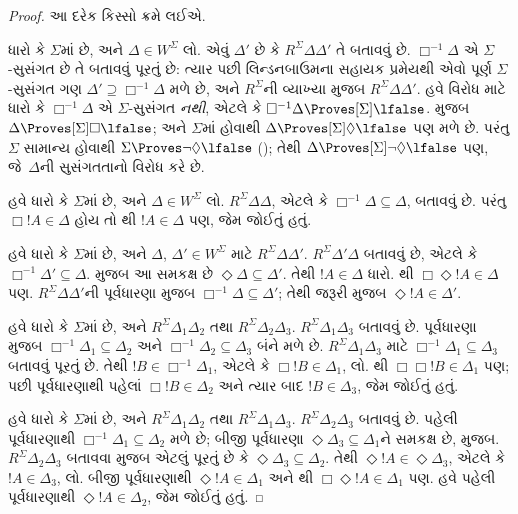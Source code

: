 \begin{proof}
  આ દરેક કિસ્સો ક્રમે લઈએ.

  ધારો કે $\Sigma$માં  છે, અને $\Delta \in W^\Sigma$ લો.
  એવું $\Delta'$ છે કે $R^\Sigma \Delta\Delta'$ તે બતાવવું છે.
  $\Box^{-1}\Delta$ એ $\Sigma$-સુસંગત છે તે બતાવવું પૂરતું છે:
  ત્યાર પછી લિન્ડનબાઉમના સહાયક પ્રમેયથી એવો પૂર્ણ
  $\Sigma$-સુસંગત ગણ $\Delta' \supseteq \Box^{-1}\Delta$ મળે છે,
  અને $R^\Sigma$ની વ્યાખ્યા
  મુજબ
  $R^\Sigma \Delta\Delta'$. હવે વિરોધ માટે ધારો કે
  $\Box^{-1}\Delta$ એ $\Sigma$-સુસંગત \emph{નથી}, એટલે કે
  $\Box^{-1}\Delta \Proves[\Sigma] \lfalse$.
   મુજબ $\Delta \Proves[\Sigma]
  \Box\lfalse$; અને $\Sigma$માં  હોવાથી
  $\Delta \Proves[\Sigma] \Diamond\lfalse$ પણ મળે છે.
  પરંતુ $\Sigma$ સામાન્ય હોવાથી $\Sigma \Proves
  \lnot\Diamond \lfalse$ ();
  તેથી $\Delta \Proves[\Sigma] \lnot\Diamond \lfalse$ પણ,
  જે~$\Delta$ની સુસંગતતાનો વિરોધ કરે છે.

  હવે ધારો કે $\Sigma$માં  છે, અને $\Delta \in W^\Sigma$
  લો. $R^\Sigma \Delta\Delta$, એટલે કે
  $\Box^{-1}\Delta \subseteq \Delta$, બતાવવું છે. પરંતુ
  $\Box!A \in \Delta$ હોય તો થી $!A \in \Delta$ પણ,
  જેમ જોઈતું હતું.

  હવે ધારો કે $\Sigma$માં  છે, અને $\Delta$,
  $\Delta' \in W^\Sigma$ માટે $R^\Sigma \Delta\Delta'$.
  $R^\Sigma \Delta'\Delta$ બતાવવું છે, એટલે કે
  $\Box^{-1}\Delta' \subseteq \Delta$.
     મુજબ આ સમકક્ષ છે
  $\Diamond\Delta \subseteq \Delta'$. તેથી $!A \in \Delta$
  ધારો. થી $\Box\Diamond!A \in \Delta$ પણ.
  $R^\Sigma \Delta\Delta'$ની પૂર્વધારણા
   મુજબ
  $\Box^{-1}\Delta \subseteq \Delta'$; તેથી જરૂરી મુજબ
  $\Diamond!A \in \Delta'$.

  હવે ધારો કે $\Sigma$માં  છે, અને $R^\Sigma
  \Delta_1\Delta_2$ તથા $R^\Sigma \Delta_2\Delta_3$.
  $R^\Sigma \Delta_1\Delta_3$ બતાવવું છે. પૂર્વધારણા
   મુજબ
  $\Box^{-1}\Delta_1 \subseteq \Delta_2$ અને
  $\Box^{-1}\Delta_2 \subseteq \Delta_3$ બંને મળે છે.
  $R^\Sigma \Delta_1\Delta_3$ માટે
  $\Box^{-1}\Delta_1 \subseteq \Delta_3$ બતાવવું પૂરતું છે.
  તેથી $!B \in \Box^{-1}\Delta_1$, એટલે કે
  $\Box!B \in \Delta_1$, લો. થી
  $\Box\Box!B \in \Delta_1$ પણ; પછી પૂર્વધારણાથી પહેલાં
  $\Box!B \in \Delta_2$ અને ત્યાર બાદ $!B \in \Delta_3$,
  જેમ જોઈતું હતું.

  હવે ધારો કે $\Sigma$માં  છે, અને $R^\Sigma
  \Delta_1\Delta_2$ તથા $R^\Sigma \Delta_1\Delta_3$.
  $R^\Sigma \Delta_2\Delta_3$ બતાવવું છે. પહેલી પૂર્વધારણાથી
  $\Box^{-1}\Delta_1 \subseteq \Delta_2$
   મળે છે;
  બીજી પૂર્વધારણા $\Diamond\Delta_3 \subseteq \Delta_1$ને
  સમકક્ષ છે,
     મુજબ.
  $R^\Sigma \Delta_2\Delta_3$ બતાવવા
   મુજબ
    એટલું પૂરતું છે કે%
  $\Diamond\Delta_3 \subseteq \Delta_2$.
  તેથી $\Diamond!A \in \Diamond\Delta_3$, એટલે કે
  $!A \in \Delta_3$, લો. બીજી પૂર્વધારણાથી
  $\Diamond!A \in \Delta_1$ અને થી
  $\Box\Diamond!A \in \Delta_1$ પણ. હવે પહેલી પૂર્વધારણાથી
  $\Diamond!A \in \Delta_2$, જેમ જોઈતું હતું.
  \end{proof}

